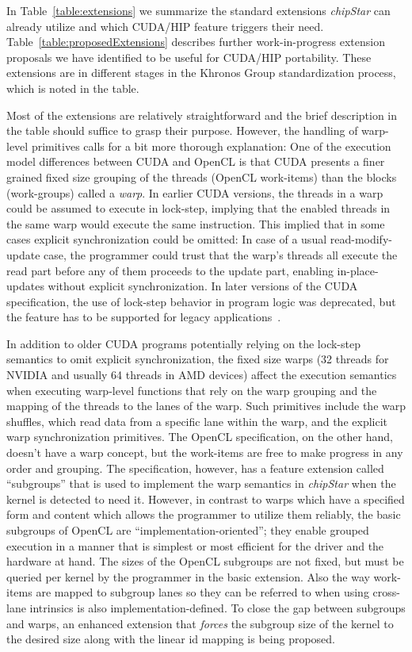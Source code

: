\documentclass[Afour,sageh,times]{sagej}
\newcommand{\chipstar}{\textit{chipStar}\xspace}
\newcommand{\mycite}[1]{\citep{#1}}
\begin{document}
In Table~\ref{table:extensions} we summarize the standard extensions \chipstar can already utilize and which CUDA/HIP feature triggers their need. Table~\ref{table:proposedExtensions} describes further work-in-progress extension proposals we have identified to be useful for CUDA/HIP portability. These extensions are in different stages in the Khronos Group standardization process, which is noted in the table.

Most of the extensions are relatively straightforward and the brief description in the table should suffice to grasp their purpose. However, the handling of warp-level primitives calls for a bit more thorough explanation:
One of the execution model differences between CUDA and OpenCL is that CUDA presents a finer grained fixed size grouping of the threads (OpenCL work-items) than the blocks (work-groups) called a \textit{warp}. In earlier CUDA versions, the threads in a warp could be assumed to execute in lock-step, implying that the enabled threads in the same warp would execute the same instruction. This implied that in some cases explicit synchronization could be omitted: In case of a usual read-modify-update case, the programmer could trust that the warp's threads all execute the read part before any of them proceeds to the update part, enabling in-place-updates without explicit synchronization. In later versions of the CUDA specification, the use of lock-step behavior in program logic was deprecated, but the feature has to be supported for legacy applications~\mycite{cuda-lockstep}.

In addition to older CUDA programs potentially relying on the lock-step semantics to omit explicit synchronization, the fixed size warps (32 threads for NVIDIA and usually 64 threads in AMD devices) affect the execution semantics when executing warp-level functions that rely on the warp grouping and the mapping of the threads to the lanes of the warp.  Such primitives include the warp shuffles, which read data from a specific lane within the warp, and the explicit warp synchronization primitives.
The OpenCL specification, on the other hand, doesn't have a warp concept, but the work-items are free to make progress in any order and grouping. The specification, however, has a feature extension called ``subgroups'' that is used to implement the warp semantics in \chipstar when the kernel is detected to need it. However, in contrast to warps which have a specified form and content which allows the programmer to utilize them reliably, the basic subgroups of OpenCL are ``implementation-oriented''; they enable grouped execution in a manner that is simplest or most efficient for the driver and the hardware at hand. The sizes of the OpenCL subgroups are not fixed, but must be queried per kernel by the programmer in the basic extension. Also the way work-items are mapped to subgroup lanes so they can be referred to when using cross-lane intrinsics is also implementation-defined. To close the gap between subgroups and warps, an enhanced extension that \textit{forces} the subgroup size of the kernel to the desired size along with the linear id mapping is being proposed.
\end{document}
